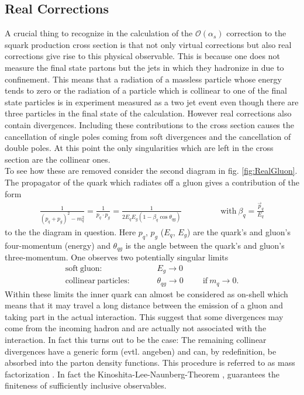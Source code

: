 \subsection{Real Corrections}
A crucial thing to recognize in the calculation of the $\mathcal{O}(\alpha_s)$ correction to the squark production cross section is that not only virtual corrections but also real corrections give rise to this physical observable. This is because one does not measure the final state partons but the jets in which they hadronize in due to confinement. This means that a radiation of a massless particle whose energy tends to zero or the radiation of a  particle which is collinear to one of the final state particles is in experiment measured as a two jet event even though there are three particles in the final state of the calculation. However real corrections also contain divergences. Including these contributions to the cross section causes the cancellation of single poles coming from soft divergences and the cancellation of double poles. At this point the only singularities which are left in the cross section are the collinear ones.\\
To see how these are removed consider the second diagram in fig. \ref{fig:RealGluon}. The propagator of the quark which radiates off a gluon gives a contribution of the form
\begin{align}
\frac{1}{(p_q + p_g)^2 - m_q^2} = \frac{1}{p_q \cdot p_g} = \frac{1}{2E_qE_g(1-\beta_q \cos \theta_{qg})} \hspace{2cm} \mathrm{with}\ \beta_q = \frac{\vec{p}_q}{E_q}
\end{align}
to the the diagram in question. Here $p_q$, $p_g$ ($E_q$, $E_g$) are the quark's and gluon's four-momentum (energy) and $\theta_{qg}$ is the angle between the quark's and gluon's three-momentum. One observes two potentially singular limits
\begin{align}
\mathrm{soft\ gluon:}& \hspace{1cm} E_g \to 0\\
\mathrm{collinear\ particles:}& \hspace{1cm} \theta_{qg} \to 0 \hspace{1cm} \mathrm{if}\ m_q \to 0.
\end{align}
Within these limits the inner quark can almost be considered as on-shell which means that it may travel a long distance between the emission of a gluon and taking part in the actual interaction. This suggest that some divergences may come from the incoming hadron and are actually not associated with the interaction. In fact this turns out to be the case: The remaining collinear divergences have a generic form (evtl. angeben) and can, by redefinition, be absorbed into the parton density functions. This procedure is referred to as mass factorization \cite{dissertori2003quantum}. In fact the Kinoshita-Lee-Naunberg-Theorem \cite{1962JMP.....3..650K},\cite{PhysRev.133.B1549} guarantees the finiteness of sufficiently inclusive observables.\\
